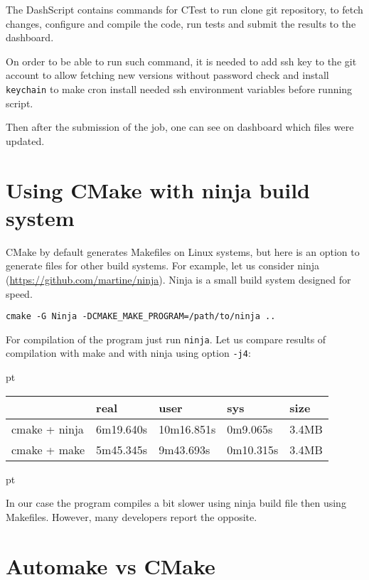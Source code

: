 \documentclass[a4paper,10pt]{article}
\begin{document}
The DashScript contains commands for CTest to run clone git repository, to fetch changes, configure and compile the code, run tests and submit the results to the dashboard.

On order to be able to run such command, it is needed to add ssh key to the git account to allow fetching new versions without password check and install \texttt{keychain} to make cron install needed ssh environment variables before running script.

Then after the submission of the job, one can see on dashboard which files were updated.

\section{Using CMake with ninja build system }

CMake by default generates Makefiles on Linux systems, but here is an option to generate files for other build systems. For example, let us consider ninja (\url{https://github.com/martine/ninja}). Ninja is a small build system designed for speed.

\begin{verbatim}
cmake -G Ninja -DCMAKE_MAKE_PROGRAM=/path/to/ninja ..
\end{verbatim}

For compilation of the program just run \texttt{ninja}.
Let us compare results of compilation with make and with ninja using option \texttt{-j4}:

 pt

\begin{tabular}{|l|l|l|l|l|}
	\hline
	& real & user & sys & size\\
	\hline
	cmake + ninja & 6m19.640s & 10m16.851s & 0m9.065s & 3.4MB\\
	cmake + make  & 5m45.345s & 9m43.693s & 0m10.315s & 3.4MB\\
	\hline	
\end{tabular}



 pt

In our case the program compiles a bit slower using ninja build file then using Makefiles. However, many developers report the opposite.  



\section{Automake vs CMake}
\end{document}

